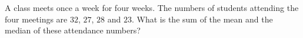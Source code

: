 A class meets once a week for four weeks. The numbers of students attending the four meetings are $32$, $27$, $28$ and $23$. What is the sum of the mean and the median of these attendance numbers?
